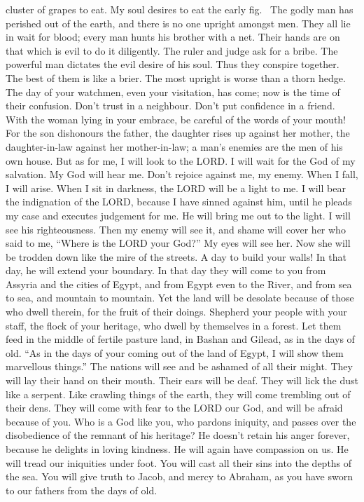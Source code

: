 cluster of grapes to eat. My soul desires to eat the early
fig.~ The godly man has perished out of the earth, and there
is no one upright amongst men. They all lie in wait for blood; every man
hunts his brother with a net.  Their hands are on that which
is evil to do it diligently. The ruler and judge ask for a bribe. The
powerful man dictates the evil desire of his soul. Thus they conspire
together.  The best of them is like a brier. The most
upright is worse than a thorn hedge. The day of your watchmen, even your
visitation, has come; now is the time of their confusion. 
Don't trust in a neighbour. Don't put confidence in a friend. With the
woman lying in your embrace, be careful of the words of your mouth!
 For the son dishonours the father, the daughter rises up
against her mother, the daughter-in-law against her mother-in-law; a
man's enemies are the men of his own house.  But as for me,
I will look to the LORD. I will wait for the God of my salvation. My God
will hear me.  Don't rejoice against me, my enemy. When I
fall, I will arise. When I sit in darkness, the LORD will be a light to
me.  I will bear the indignation of the LORD, because I have
sinned against him, until he pleads my case and executes judgement for
me. He will bring me out to the light. I will see his righteousness.
 Then my enemy will see it, and shame will cover her who
said to me, ``Where is the LORD your God?'' My eyes will see her. Now
she will be trodden down like the mire of the streets.  A
day to build your walls! In that day, he will extend your boundary.
 In that day they will come to you from Assyria and the
cities of Egypt, and from Egypt even to the River, and from sea to sea,
and mountain to mountain.  Yet the land will be desolate
because of those who dwell therein, for the fruit of their doings.
 Shepherd your people with your staff, the flock of your
heritage, who dwell by themselves in a forest. Let them feed in the
middle of fertile pasture land, in Bashan and Gilead, as in the days of
old.  ``As in the days of your coming out of the land of
Egypt, I will show them marvellous things.''  The nations
will see and be ashamed of all their might. They will lay their hand on
their mouth. Their ears will be deaf.  They will lick the
dust like a serpent. Like crawling things of the earth, they will come
trembling out of their dens. They will come with fear to the LORD our
God, and will be afraid because of you.  Who is a God like
you, who pardons iniquity, and passes over the disobedience of the
remnant of his heritage? He doesn't retain his anger forever, because he
delights in loving kindness.  He will again have compassion
on us. He will tread our iniquities under foot. You will cast all their
sins into the depths of the sea.  You will give truth to
Jacob, and mercy to Abraham, as you have sworn to our fathers from the
days of old.
